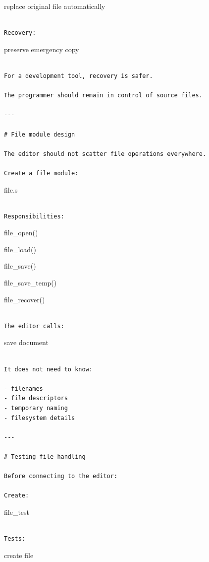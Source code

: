 \documentclass[
  oneside,
  openany]{book}
\begin{document}
replace original file automatically

\begin{verbatim}

Recovery:
\end{verbatim}

preserve emergency copy

\begin{verbatim}

For a development tool, recovery is safer.

The programmer should remain in control of source files.

---

# File module design

The editor should not scatter file operations everywhere.

Create a file module:
\end{verbatim}

file.s

\begin{verbatim}

Responsibilities:
\end{verbatim}

file\_open()

file\_load()

file\_save()

file\_save\_temp()

file\_recover()

\begin{verbatim}

The editor calls:
\end{verbatim}

save document

\begin{verbatim}

It does not need to know:

- filenames
- file descriptors
- temporary naming
- filesystem details

---

# Testing file handling

Before connecting to the editor:

Create:
\end{verbatim}

file\_test

\begin{verbatim}

Tests:
\end{verbatim}

create file
\end{document}
